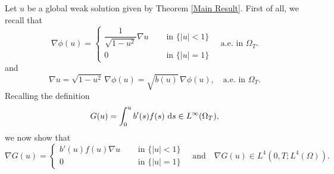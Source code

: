 \documentclass[11pt,  reqno]{amsart}%
\theoremstyle{plain}
\theoremstyle{definition}
\theoremstyle{remark}
\numberwithin{equation}{section}
\newcommand{\ve}{\varepsilon}
\newcommand{\dt}{\textup{d}t}
\newcommand{\ds}{\textup{d}s}
\begin{document}
Let $u$ be a global weak solution given by Theorem \ref{Main Result}. First of all, we
recall that
\begin{equation}
\label{nabla phiu -2}
    \nabla \phi(u)= 
    \begin{cases}
     \dfrac{1}{\sqrt{1-u^2}} \nabla u \quad &\text{ in } \{ |u|< 1 \}
     \\
     0 \quad &\text{ in } \{ |u|= 1 \}
    \end{cases}
    \quad \text{a.e. in  } \Omega_T.
\end{equation} 
 and
\begin{equation}
\label{nabla u -2}
 \nabla u = \sqrt{1-u^2} \, \nabla \phi(u)= \sqrt{b(u)} \, \nabla \phi(u), \quad \text{a.e. in } \Omega_T.
\end{equation}
Recalling the definition
$$
G(u)=\int_0^u b'(s)f(s) \ \ds \in L^\infty( \Omega_T ),
$$
we now show that
\begin{equation}
\label{nabla G point}
\nabla G(u) = 
\begin{cases} 
b'(u) f(u) \nabla u \quad &\text{ in } \{ |u|< 1 \}
     \\
     0 \quad &\text{ in } \{ |u|= 1 \}
\end{cases}
\quad \text{and} \quad 
\nabla G(u)
\in L^4(0,T; L^4(\Omega)).
\end{equation}
\end{document}
